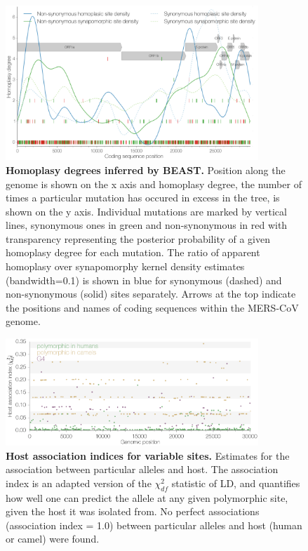 \documentclass[11pt,oneside,letterpaper]{article}
\begin{document}
\begin{figure}[h]
	\centering	
	\includegraphics[width=0.85\textwidth]{figures/supp_MERS_BEAST_homoplasyRate.png}
	\caption{\textbf{Homoplasy degrees inferred by BEAST.}
Position along the genome is shown on the x axis and homoplasy degree, the number of times a particular mutation has occured in excess in the tree, is shown on the y axis.
Individual mutations are marked by vertical lines, synonymous ones in green and non-synonymous in red with transparency representing the posterior probability of a given homoplasy degree for each mutation.
The ratio of apparent homoplasy over synapomorphy kernel density estimates (bandwidth=0.1) is shown in blue for synonymous (dashed) and non-synonymous (solid) sites separately.
Arrows at the top indicate the positions and names of coding sequences within the MERS-CoV genome.}
	\label{homoplasyRates_Bayesian}
\end{figure}

\begin{figure}[h]
	\centering	
	\includegraphics[width=0.85\textwidth]{figures/supp_MERS_hostAssociation.png}
	\caption{\textbf{Host association indices for variable sites.}
Estimates for the association between particular alleles and host.
The association index is an adapted version of the $\chi^{2}_{df}$ statistic of LD, and quantifies how well one can predict the allele at any given polymorphic site, given the host it was isolated from.
No perfect associations (association index = 1.0) between particular alleles and host (human or camel) were found.}
	\label{host_association}
\end{figure}

\clearpage

%
%
\end{document}
